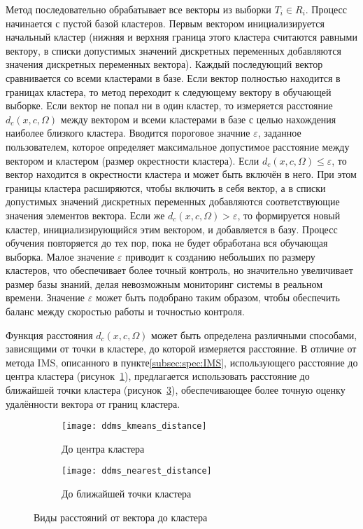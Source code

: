 Метод последовательно обрабатывает все векторы из выборки $T_i\in R_i$. Процесс начинается с пустой базой кластеров. Первым вектором инициализируется начальный кластер (нижняя и верхняя граница этого кластера считаются равными вектору, в списки допустимых значений дискретных переменных добавляются значения дискретных переменных вектора). Каждый последующий вектор сравнивается со всеми кластерами в базе. Если вектор полностью находится в границах кластера, то метод переходит к следующему вектору в обучающей выборке. Если вектор не попал ни в один кластер, то измеряется расстояние $d_c(x,c,\Omega)$ между вектором и всеми кластерами в базе с целью нахождения наиболее близкого кластера. Вводится пороговое значние $\varepsilon$, заданное пользователем, которое определяет максимальное допустимое расстояние между вектором и кластером (размер окрестности кластера). Если $d_c(x,c,\Omega) \leq \varepsilon$, то вектор находится в окрестности кластера и может быть включён в него. При этом границы кластера расширяются, чтобы включить в себя вектор, а в списки допустимых значений дискретных переменных добавляются соответствующие значения элементов вектора. Если же $d_c(x,c,\Omega) > \varepsilon$, то формируется новый кластер, инициализирующийся этим вектором, и добавляется в базу. Процесс обучения повторяется до тех пор, пока не будет обработана вся обучающая выборка. Малое значение $\varepsilon$ приводит к созданию небольших по размеру кластеров, что обеспечивает более точный контроль, но значительно увеличивает размер базы знаний, делая невозможным мониторинг системы в реальном времени. Значение $\varepsilon$ может быть подобрано таким образом, чтобы обеспечить баланс между скоростью работы и точностью контроля.

Функция расстояния $d_c(x,c,\Omega)$ может быть определена различными способами, зависящими от точки в кластере, до которой измеряется расстояние. В отличие от метода IMS, описанного в пункте\ref{subsec:spec:IMS}, использующего расстояние до центра кластера (рисунок~\ref{fig:spec:DDMS:KMeansDistance}), предлагается использовать расстояние до ближайшей точки кластера (рисунок~\ref{fig:spec:DDMS:NearestDistance}), обеспечивающее более точную оценку удалённости вектора от границ кластера.

\begin{figure}[h]
	\begin{subfigure}[b]{0.35\textwidth}
		\texttt{[image: ddms\_kmeans\_distance]}
		\caption{До центра кластера}
		\label{fig:spec:DDMS:KMeansDistance}
	\end{subfigure}
	\hspace{0.5cm}
	\begin{subfigure}[b]{0.35\textwidth}
		\texttt{[image: ddms\_nearest\_distance]}
		\caption{До ближайшей точки кластера}
		\label{fig:spec:DDMS:NearestDistance}
	\end{subfigure}
	\caption{Виды расстояний от вектора до кластера}
\end{figure}

